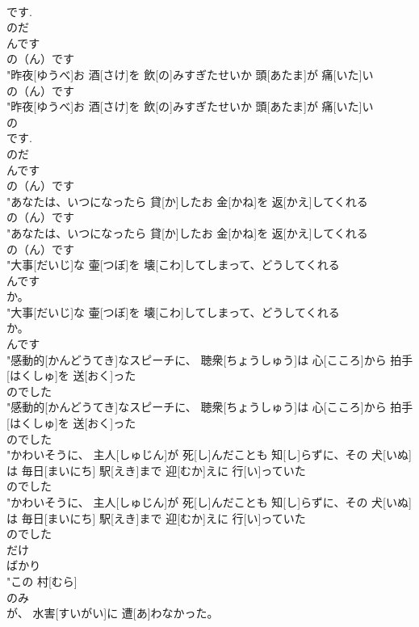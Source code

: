 \documentclass[8pt]{extreport}
\begin{document}
\begin{CJK}{UTF8}{min}
\\	です. 
\\	のだ 
\\	んです	
\\	の（ん）です
\\	"昨夜[ゆうべ]お 酒[さけ]を 飲[の]みすぎたせいか 頭[あたま]が 痛[いた]い
\\	の（ん）です
\\	"昨夜[ゆうべ]お 酒[さけ]を 飲[の]みすぎたせいか 頭[あたま]が 痛[いた]い
\\	の 
\\	です. 
\\	のだ 
\\	んです	
\\	の（ん）です
\\	"あなたは、いつになったら 貸[か]したお 金[かね]を 返[かえ]してくれる
\\	の（ん）です
\\	"あなたは、いつになったら 貸[か]したお 金[かね]を 返[かえ]してくれる
\\	の（ん）です
\\	"大事[だいじ]な 壷[つぼ]を 壊[こわ]してしまって、どうしてくれる
\\	んです
\\	か。
\\	"大事[だいじ]な 壷[つぼ]を 壊[こわ]してしまって、どうしてくれる
\\	か。
\\	んです
\\	"感動的[かんどうてき]なスピーチに、 聴衆[ちょうしゅう]は 心[こころ]から 拍手[はくしゅ]を 送[おく]った
\\	のでした
\\	"感動的[かんどうてき]なスピーチに、 聴衆[ちょうしゅう]は 心[こころ]から 拍手[はくしゅ]を 送[おく]った
\\	のでした
\\	"かわいそうに、 主人[しゅじん]が 死[し]んだことも 知[し]らずに、その 犬[いぬ]は 毎日[まいにち] 駅[えき]まで 迎[むか]えに 行[い]っていた
\\	のでした
\\	"かわいそうに、 主人[しゅじん]が 死[し]んだことも 知[し]らずに、その 犬[いぬ]は 毎日[まいにち] 駅[えき]まで 迎[むか]えに 行[い]っていた
\\	のでした
\\	だけ 
\\	ばかり 
\\	"この 村[むら]
\\	のみ
\\	が、 水害[すいがい]に 遭[あ]わなかった。

\end{CJK}
\end{document}
